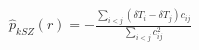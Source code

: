 \documentclass{standalone}
\begin{document}
$\hat p _{kSZ}(r)= -\frac{\sum_{i<j}(\delta T_i - \delta T_j)c_{ij}}{\sum_{i<j}c_{ij}^2}$
\end{document}
